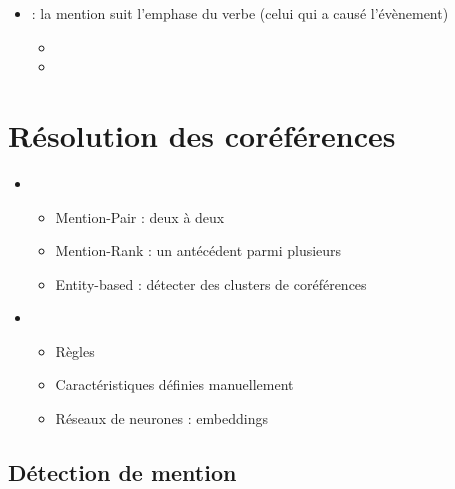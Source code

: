 \documentclass{KodeBook}
\begin{document}
\begin{itemize}
	\item {} : la mention suit l'emphase du verbe (celui qui a causé l'évènement)
	\begin{itemize}
		\item {}
		\item {}
	\end{itemize}
	
\end{itemize}

\section{Résolution des coréférences}


\begin{itemize}
	\item {}
	\begin{itemize}
		\item Mention-Pair : deux à deux
		\item Mention-Rank : un antécédent parmi plusieurs
		\item Entity-based : détecter des clusters de coréférences
	\end{itemize}
	
	\item {}
	\begin{itemize}
		\item Règles
		\item Caractéristiques définies manuellement
		\item Réseaux de neurones : embeddings
	\end{itemize}
\end{itemize}

\subsection{Détection de mention}
\end{document}
